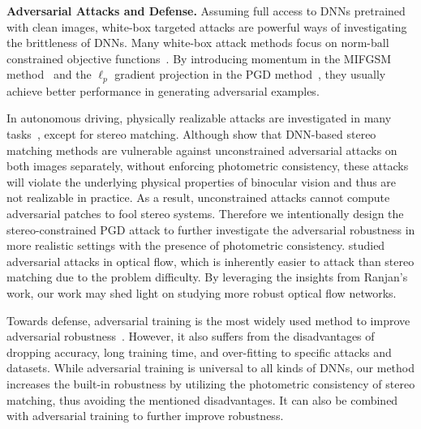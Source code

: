 \documentclass[10pt,twocolumn,letterpaper]{article}
\begin{document}
 
\textbf{Adversarial Attacks and Defense.}
Assuming full access to DNNs pretrained with clean images, white-box targeted attacks are powerful ways of investigating the brittleness of DNNs. Many white-box attack methods focus on norm-ball constrained objective functions~\cite{LBFGS,IFGSM,CWAttack,MIFGSM,DDNAttack}. 
By introducing momentum in the MIFGSM method~\cite{MIFGSM} and the $\ell_{p}$ gradient projection in the PGD method~\cite{PGD}, they usually achieve better performance in generating adversarial examples. 


In autonomous driving, physically realizable attacks are investigated in many tasks~\cite{Eykholt_2018_CVPR, ranjan2019attacking, Cao_2020_MLSys, tu2020physically, tu2021exploring}, except for stereo matching. Although \cite{wong2021stereopagnosia} show that DNN-based stereo matching methods are vulnerable against unconstrained adversarial attacks on both images separately, without enforcing photometric consistency, these attacks will violate the underlying physical properties of binocular vision and thus are not realizable in practice. As a result, unconstrained attacks cannot compute adversarial patches to fool stereo systems. Therefore we intentionally design the stereo-constrained PGD attack to further investigate the adversarial robustness in more realistic settings with the presence of photometric consistency. 
\cite{ranjan2019attacking} studied adversarial attacks in optical flow, which is inherently easier to attack than stereo matching due to the problem difficulty. By leveraging the insights from Ranjan's work, our work may shed light on studying more robust optical flow networks.


Towards defense, adversarial training is the most widely used method to improve adversarial robustness~\cite{PGD,Bai_ijcai2021-591}. However, it also suffers from the disadvantages of dropping accuracy, long training time, and over-fitting to specific attacks and datasets. While adversarial training is universal to all kinds of DNNs, our method increases the built-in robustness by utilizing the photometric consistency of stereo matching, thus avoiding the mentioned disadvantages. It can also be combined with adversarial training to further improve robustness.  
\end{document}
